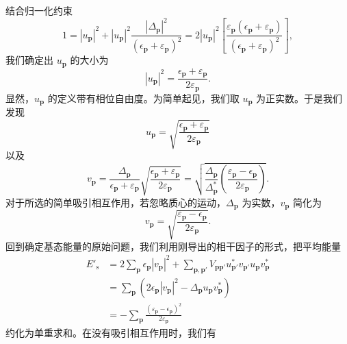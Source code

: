 结合归一化约束
\begin{equation*}
1=\left|u_{\mathbf p}\right|^2+\left|u_{\mathbf p}\right|^2\frac{\left|\Delta_{\mathbf p}\right|^2}{\left(\epsilon_{\mathbf p}+\varepsilon_{\mathbf p}\right)^2}=2\left|u_{\mathbf p}\right|^2\left[\frac{\varepsilon_{\mathbf p}\left(\epsilon_{\mathbf p}+\varepsilon_{\mathbf p}\right)}{\left(\epsilon_{\mathbf p}+\varepsilon_{\mathbf p}\right)^2}\right], \tag{12.193}
\end{equation*}
我们确定出 $u_{\mathbf p}$ 的大小为
\begin{equation*}
\left|u_{\mathbf p}\right|^2=\frac{\epsilon_{\mathbf p}+\varepsilon_{\mathbf p}}{2\varepsilon_{\mathbf p}}. \tag{12.194}
\end{equation*}
显然，$u_{\mathbf p}$ 的定义带有相位自由度。为简单起见，我们取 $u_{\mathbf p}$ 为正实数。于是我们发现
\begin{equation*}
u_{\mathbf p}=\sqrt{\frac{\epsilon_{\mathbf p}+\varepsilon_{\mathbf p}}{2\varepsilon_{\mathbf p}}} \tag{12.195}
\end{equation*}
以及
\begin{equation*}
v_{\mathbf p}=\frac{\Delta_{\mathbf p}}{\epsilon_{\mathbf p}+\varepsilon_{\mathbf p}}\sqrt{\frac{\epsilon_{\mathbf p}+\varepsilon_{\mathbf p}}{2\varepsilon_{\mathbf p}}}=\sqrt{\frac{\Delta_{\mathbf p}}{\Delta^*_{\mathbf p}}\left(\frac{\varepsilon_{\mathbf p}-\epsilon_{\mathbf p}}{2\varepsilon_{\mathbf p}}\right)}. \tag{12.196}
\end{equation*}
对于所选的简单吸引相互作用，若忽略质心的运动，$\Delta_{\mathbf p}$ 为实数，$v_{\mathbf p}$ 简化为
\begin{equation*}
v_{\mathbf p}=\sqrt{\frac{\varepsilon_{\mathbf p}-\epsilon_{\mathbf p}}{2\varepsilon_{\mathbf p}}}. \tag{12.197}
\end{equation*}
回到确定基态能量的原始问题，我们利用刚导出的相干因子的形式，把平均能量
\begin{align*}
E'_{\mathrm s}&=2\sum_{\mathbf p}\epsilon_{\mathbf p}\left|v_{\mathbf p}\right|^2+\sum_{\mathbf p,\mathbf p'}V_{\mathbf p\mathbf p'}u^*_{\mathbf p'}v_{\mathbf p'}u_{\mathbf p}v^*_{\mathbf p}\\
&=\sum_{\mathbf p}\left(2\epsilon_{\mathbf p}\left|v_{\mathbf p}\right|^2-\Delta_{\mathbf p}u_{\mathbf p}v^*_{\mathbf p}\right)\\
&=-\sum_{\mathbf p}\frac{\left(\varepsilon_{\mathbf p}-\epsilon_{\mathbf p}\right)^2}{2\varepsilon_{\mathbf p}} \tag{12.198}
\end{align*}
约化为单重求和。在没有吸引相互作用时，我们有
